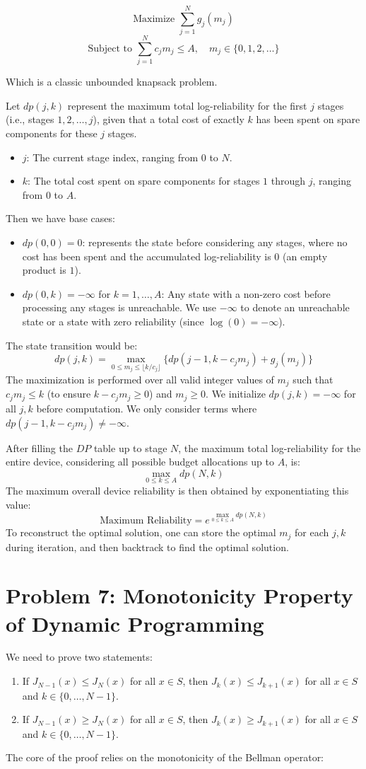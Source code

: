 \documentclass[11pt, a4paper, oneside]{memoir}
\begin{document}
\[ \text{Maximize } \sum_{j=1}^N g_j(m_j) \]
\[ \text{Subject to } \sum_{j=1}^N c_j m_j \leq A, \quad m_j \in \{0, 1, 2, \ldots\} \]

Which is a classic unbounded knapsack problem.

Let $dp(j, k)$ represent the maximum total log-reliability for the first $j$ stages (i.e., stages $1, 2, \ldots, j$), given that a total cost of exactly $k$ has been spent on spare components for these $j$ stages.
\begin{itemize}
  \item $j$: The current stage index, ranging from $0$ to $N$.
  \item $k$: The total cost spent on spare components for stages $1$ through $j$, ranging from $0$ to $A$.
\end{itemize}
Then we have base cases:
\begin{itemize}
  \item $dp(0, 0) = 0$: represents the state before considering any stages,
        where no cost has been spent and the accumulated log-reliability is $0$ (an empty product is $1$).
  \item $dp(0, k) = -\infty$ for $k = 1, \ldots, A$: Any state with a non-zero cost before processing any stages is unreachable.
        We use $-\infty$ to denote an unreachable state or a state with zero reliability (since $\log(0) = -\infty$).
\end{itemize}
The state transition would be:
\[ dp(j, k) = \max_{0 \leq m_j \leq \lfloor k / c_j \rfloor} \{ dp(j-1, k - c_j m_j) + g_j(m_j) \} \]
The maximization is performed over all valid integer values of $m_j$ such that $c_j m_j \leq k$
(to ensure $k - c_j m_j \geq 0$) and $m_j \geq 0$. We initialize $dp(j, k) = -\infty$ for all $j, k$ before computation.
We only consider terms where $dp(j-1, k - c_j m_j) \neq -\infty$.

After filling the $DP$ table up to stage $N$, the maximum total log-reliability for the entire device,
considering all possible budget allocations up to $A$, is:
\[ \max_{0 \leq k \leq A} dp(N, k) \]
The maximum overall device reliability is then obtained by exponentiating this value:
\[ \text{Maximum Reliability} = e^{\max_{0 \leq k \leq A} dp(N, k)} \]
To reconstruct the optimal solution, one can store the optimal $m_j$ for each $j, k$ during iteration,
and then backtrack to find the optimal solution.

\chapter{Problem 7: Monotonicity Property of Dynamic Programming}
We need to prove two statements:
\begin{enumerate}
  \item If $J_{N-1}(x) \le J_N(x)$ for all $x \in S$, then $J_k(x) \le J_{k+1}(x)$ for all $x \in S$ and $k \in \{0, \dots, N-1\}$.
  \item If $J_{N-1}(x) \ge J_N(x)$ for all $x \in S$, then $J_k(x) \ge J_{k+1}(x)$ for all $x \in S$ and $k \in \{0, \dots, N-1\}$.
\end{enumerate}
The core of the proof relies on the monotonicity of the Bellman operator:
\end{document}
